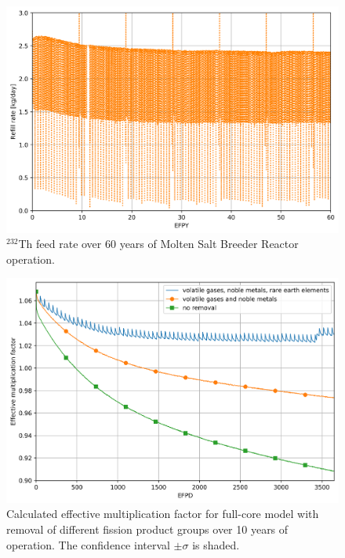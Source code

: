 \documentclass[review]{elsarticle}
\begin{document}
\begin{figure}[htbp!]
    \begin{center}
		\includegraphics[width=\textwidth]{Th_refill_rate.png} 
    \end{center}
	\caption{$^{232}$Th feed rate over 60 years of Molten Salt Breeder Reactor operation.}
	\label{fig:th-rate}
\end{figure}
\begin{figure}[htbp!]
    \begin{center}
		\includegraphics[width=\textwidth]{keff_rem_cases.png} 
    \end{center}
	\caption{Calculated effective multiplication factor for full-core model with removal of different fission product groups over 10 years of operation. The confidence interval $\pm\sigma$ is shaded.}
	\label{fig:fp-removal}
\end{figure}
\end{document}
